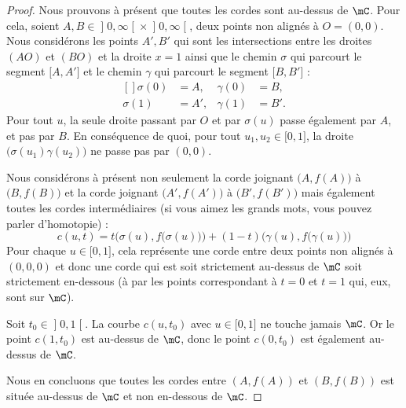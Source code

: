\begin{proof}
	Nous prouvons à présent que toutes les cordes sont au-dessus de \( \mC\). Pour cela, soient \( A,B\in \mathopen] 0 , \infty \mathclose[\times \mathopen] 0 , \infty \mathclose[\), deux points non alignés à \( O=(0,0)\). Nous considérons les points \( A',B'\) qui sont les intersections entre les droites \( (AO)\) et \( (BO)\) et la droite \( x=1\) ainsi que le chemin \( \sigma\) qui parcourt le segment \( \mathopen[ A , A' \mathclose]\) et le chemin \( \gamma\) qui parcourt le segment \( \mathopen[ B , B' \mathclose]\) :
		\begin{equation}
			\begin{aligned}[]
				\sigma(0) & =A,  & \gamma(0) & =B,  \\
				\sigma(1) & =A', & \gamma(1) & =B'.
			\end{aligned}
		\end{equation}
		Pour tout \( u\), la seule droite passant par \( O\) et par \( \sigma(u)\) passe également par \( A\), et pas par \( B\). En conséquence de quoi, pour tout \( u_1,u_2\in \mathopen[ 0 , 1 \mathclose]\), la droite \( \big( \sigma(u_1)\gamma(u_2) \big)\) ne passe pas par \( (0,0)\).

		Nous considérons à présent non seulement la corde joignant \( \big( A,f(A) \big)\) à \( \big( B,f(B) \big)\) et la corde joignant \( \big( A',f(A') \big)\) à \( \big( B',f(B') \big)\) mais également toutes les cordes intermédiaires (si vous aimez les grands mots, vous pouvez parler d'homotopie) :
		\begin{equation}
			c(u,t)=t\Big( \sigma(u), f\big(\sigma(u)\big) \Big)+(1-t)\Big( \gamma(u),f\big( \gamma(u) \big) \Big)
		\end{equation}
		Pour chaque \( u\in\mathopen[ 0 , 1 \mathclose]\), cela représente une corde entre deux points non alignés à \( (0,0,0)\) et donc une corde qui est soit strictement au-dessus de \( \mC\) soit strictement en-dessous (à par les points correspondant à \( t=0\) et \( t=1\) qui, eux, sont sur \( \mC\)).

		Soit \( t_0\in \mathopen] 0 , 1 \mathclose[\). La courbe \( c(u,t_0)\) avec \( u\in\mathopen[ 0 , 1 \mathclose]\) ne touche jamais \( \mC\). Or le point \( c(1,t_0)\) est au-dessus de \( \mC\), donc le point \( c(0,t_0)\) est également au-dessus de \( \mC\).

	Nous en concluons que toutes les cordes entre \( (A,f(A)) \) et \( (B,f(B))\) est située au-dessus de \( \mC\) et non en-dessous de \( \mC\).
\end{proof}

